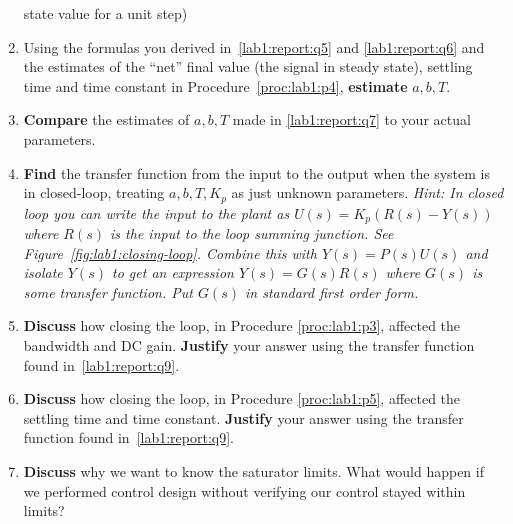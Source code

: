 \begin{deliverable}[label={lab1:report}]
\begin{enumerate}[label={(\arabic*)}]
{{      state value for a unit step)}
    }
    \item{
      \label{lab1:report:q7}
      Using the formulas you derived in~\ref{lab1:report:q5} and
      \ref{lab1:report:q6} and the estimates of the ``net'' final value (the signal in steady state), settling time and time constant in Procedure~\ref{proc:lab1:p4},
      \textbf{estimate} \(a, b, T.\)
    }
    \item{
      \label{lab1:report:q8}
      \textbf{Compare} the estimates of \(a, b, T\) made in
      \ref{lab1:report:q7} to your actual parameters.
    }
    \item{
      \label{lab1:report:q9}
      \textbf{Find} the transfer
      function from the input to the output when the system is in
      closed-loop, treating \(a, b, T, K_p\) as just unknown parameters.
      \emph{Hint: In closed loop you can write the input to the plant as
      \(U(s) = K_p(R(s) - Y(s))\)
      where \(R(s)\) is the input to the loop summing junction. See
      Figure~\ref{fig:lab1:closing-loop}. Combine this with \(Y(s) = P(s)U(s)\)
      and isolate \(Y(s)\) to get an expression \(Y(s) = G(s) R(s)\) where
      \(G(s)\) is some transfer function. Put \(G(s)\) in standard first order form.}
    }
    \item{
      \label{lab1:report:q10}
      \textbf{Discuss} how closing the loop, in Procedure
      \ref{proc:lab1:p3}, affected the bandwidth and DC gain.
      \textbf{Justify} your answer using the transfer function
      found in~\ref{lab1:report:q9}.
    }
    \item{
      \label{lab1:report:q11}
      \textbf{Discuss} how closing the loop, in Procedure
      \ref{proc:lab1:p5}, affected the settling time and time constant.
      \textbf{Justify} your answer using the transfer function
      found in~\ref{lab1:report:q9}.
    }
    \item{
      \label{lab1:report:q12}
      \textbf{Discuss} why we want to know the saturator limits. What would
      happen if we performed control design without verifying our control
      stayed within limits?
    }
  \end{enumerate}
\end{deliverable}

